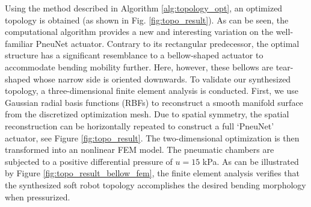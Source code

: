 Using the method described in Algorithm \ref{alg:topology_opt}, an optimized topology is obtained (as shown in Fig. \ref{fig:topo_result}). As can be seen, the computational algorithm provides a new and interesting variation on the well-familiar PneuNet actuator. Contrary to its rectangular predecessor, the optimal structure has a significant resemblance to a bellow-shaped actuator to accommodate bending mobility further. Here, however, these bellows are tear-shaped whose narrow side is oriented downwards. To validate our synthesized topology, a three-dimensional finite element analysis is conducted. First, we use Gaussian radial basis functions (RBFs) to reconstruct a smooth manifold surface from the discretized optimization mesh. Due to spatial symmetry, the spatial reconstruction can be horizontally repeated to construct a full `PneuNet' actuator, see Figure \ref{fig:topo_result}. The two-dimensional optimization is then transformed into an nonlinear FEM model. The pneumatic chambers are subjected to a positive differential pressure of $u = 15$ kPa. As can be illustrated by Figure \ref{fig:topo_result_bellow_fem}, the finite element analysis verifies that the synthesized soft robot topology accomplishes the desired bending morphology when pressurized.

